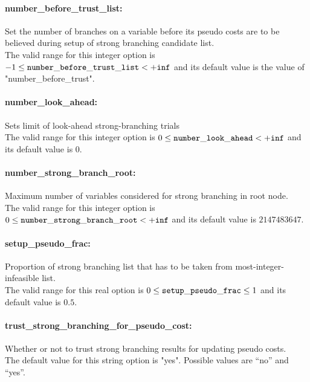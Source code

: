 \paragraph{number\_before\_trust\_list:}\label{sec:number_before_trust_list} Set the number of branches on a variable before its pseudo costs are to be believed during setup of strong branching candidate list. $\;$ \\
The valid range for this integer option is
$-1 \le {\tt number\_before\_trust\_list } <  {\tt +inf}$
and its default value is the value of "number\_before\_trust".

\paragraph{number\_look\_ahead:}\label{sec:number_look_ahead} Sets limit of look-ahead strong-branching trials $\;$ \\
 The valid range for this integer option is
$0 \le {\tt number\_look\_ahead } <  {\tt +inf}$
and its default value is $0$.


\paragraph{number\_strong\_branch\_root:}\label{sec:number_strong_branch_root} Maximum number of variables considered for strong branching in root node. $\;$ \\
 The valid range for this integer option is
$0 \le {\tt number\_strong\_branch\_root } <  {\tt +inf}$
and its default value is $2147483647$.


\paragraph{setup\_pseudo\_frac:}\label{sec:setup_pseudo_frac} Proportion of strong branching list that has to be taken from most-integer-infeasible list. $\;$ \\
 The valid range for this real option is 
$0 \le {\tt setup\_pseudo\_frac } \le 1$
and its default value is $0.5$.


\paragraph{trust\_strong\_branching\_for\_pseudo\_cost:}\label{sec:trust_strong_branching_for_pseudo_cost} Whether or not to trust strong branching results for updating pseudo costs. $\;$ \\
The default value for this string option is "yes".
Possible values are ``no'' and ``yes''.

